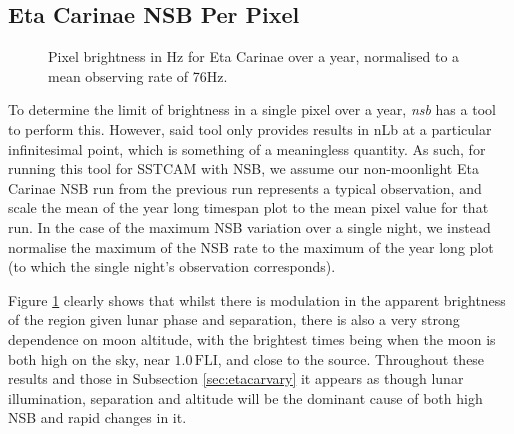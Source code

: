 \subsection{Eta Carinae NSB Per Pixel}
\label{sec:etacartimespan}
\begin{figure}[ht]
\begin{centering}
\caption{Pixel brightness in Hz for Eta Carinae over a year, normalised to a mean observing rate of 76Hz.}
\label{fig:etacar_timespan}
\end{centering}
\end{figure}

To determine the limit of brightness in a single pixel over a year, \textit{nsb} has a tool to perform this. However, said tool only provides results in nLb at a particular infinitesimal point, which is something of a meaningless quantity. As such, for running this tool for SSTCAM with NSB, we assume our non-moonlight Eta Carinae NSB run from the previous run represents a typical observation, and scale the mean of the year long timespan plot to the mean pixel value for that run. In the case of the maximum NSB variation over a single night, we instead normalise the maximum of the NSB rate to the maximum of the year long plot (to which the single night's observation corresponds).

Figure \ref{fig:etacar_timespan} clearly shows that whilst there is modulation in the apparent brightness of the region given lunar phase and separation, there is also a very strong dependence on moon altitude, with the brightest times being when the moon is both high on the sky, near $\mathrm{1.0\,FLI}$, and close to the source. Throughout these results and those in Subsection \ref{sec:etacarvary} it appears as though lunar illumination, separation and altitude will be the dominant cause of both high NSB and rapid changes in it.

